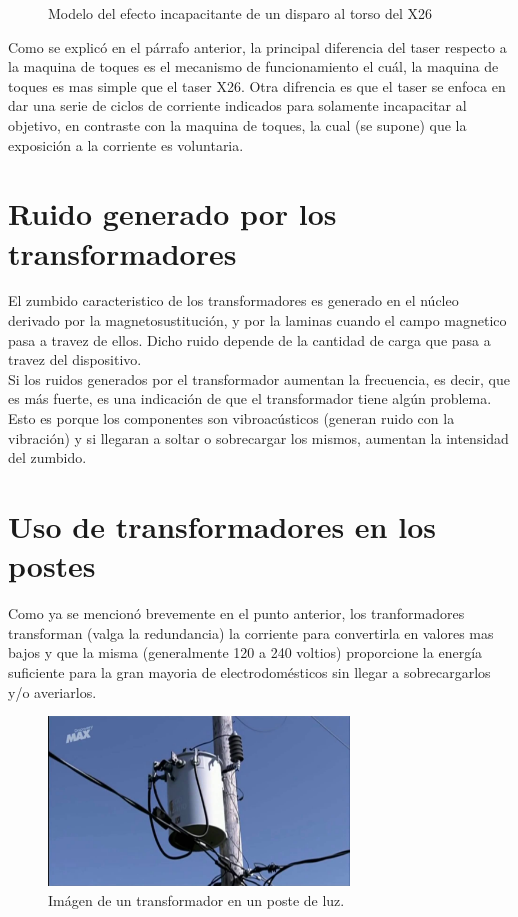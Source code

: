 \documentclass[letterpaper, 12pt]{article}
\begin{document}
\begin{justify}
\begin{figure}[H]
            \caption{Modelo del efecto incapacitante de un disparo al torso del X26}
            \label{fig:effectx26}
        \end{figure}
        \justify
        Como se explicó en el párrafo anterior, la principal diferencia del taser respecto a la maquina de toques es el mecanismo de funcionamiento el cuál, la maquina de toques es mas simple que el taser X26. Otra difrencia es que el taser se enfoca en dar una serie de ciclos de corriente indicados para
        solamente incapacitar al objetivo, en contraste con la maquina de toques, la cual (se supone) que la exposición a la corriente es voluntaria.
        \section{Ruido generado por los transformadores}
        \justify
        El zumbido caracteristico de los transformadores es generado en el núcleo derivado por la magnetosustitución, y por la laminas cuando el campo magnetico pasa a travez de ellos. Dicho ruido depende de la cantidad de carga que pasa a travez del dispositivo.
        \\ \newline
        Si los ruidos generados por el transformador aumentan la frecuencia, es decir, que es más fuerte, es una indicación de que el transformador tiene algún problema. Esto es porque los componentes son vibroacústicos (generan ruido con la vibración) y si llegaran a
        soltar o sobrecargar los mismos, aumentan la intensidad del zumbido.
        \section{Uso de transformadores en los postes}
        \justify
        Como ya se mencionó brevemente en el punto anterior, los tranformadores transforman (valga la redundancia) la corriente para convertirla en valores mas bajos y que la misma (generalmente 120 a 240 voltios) proporcione la energía suficiente para la gran mayoria de electrodomésticos sin llegar a sobrecargarlos y/o
        averiarlos. 
        \begin{figure}[ht]
            \centering
            \includegraphics[width=8cm]{trans.jpg}
            \caption{Imágen de un transformador en un poste de luz.}
        \end{figure}        

\end{justify}
\end{document}
